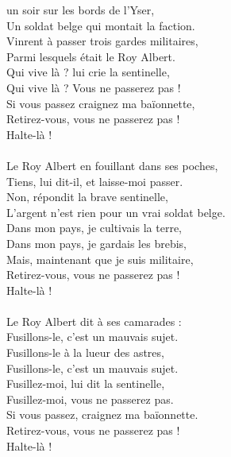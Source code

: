 
 un soir sur les bords de l’Yser,
\\Un soldat belge qui montait la faction.
\\Vinrent à passer trois gardes militaires,
\\Parmi lesquels était le Roy Albert.
\\Qui vive là ? lui crie la sentinelle,
\\Qui vive là ? Vous ne passerez pas !
\\Si vous passez craignez ma baïonnette,
\\Retirez-vous, vous ne passerez pas ! \bissimple
\\Halte-là !
\\\\Le Roy Albert en fouillant dans ses poches,
\\Tiens, lui dit-il, et laisse-moi passer.
\\Non, répondit la brave sentinelle,
\\L’argent n’est rien pour un vrai soldat belge.
\\Dans mon pays, je cultivais la terre,
\\Dans mon pays, je gardais les brebis,
\\Mais, maintenant que je suis militaire,
\\Retirez-vous, vous ne passerez pas ! \bissimple
\\Halte-là !
\\\\Le Roy Albert dit à ses camarades :
\\Fusillons-le, c’est un mauvais sujet.
\\Fusillons-le à la lueur des astres,
\\Fusillons-le, c’est un mauvais sujet.
\\Fusillez-moi, lui dit la sentinelle,
\\Fusillez-moi, vous ne passerez pas.
\\Si vous passez, craignez ma baïonnette.
\\Retirez-vous, vous ne passerez pas ! \bissimple
\\Halte-là !

